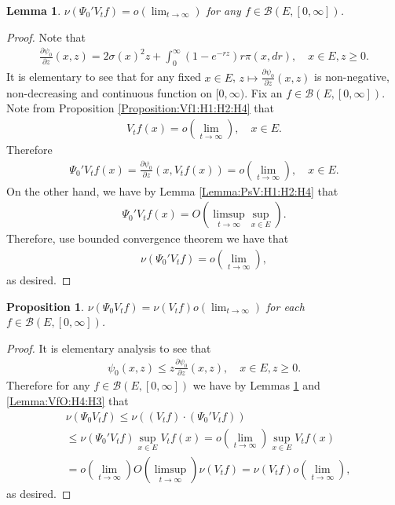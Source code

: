 \documentclass[12pt,a4paper]{amsart}
\numberwithin{equation}{section}
\theoremstyle{plain}
\newtheorem{lem}[thm]{Lemma}
\newtheorem{prop}[thm]{Proposition}
\theoremstyle{definition}
\theoremstyle{remark}
\begin{document}
\begin{lem} \label{Lemma:nPPV:H1:H2:H4}
 $\nu(\Psi_0' V_t f) = o(\lim_{t\to \infty})$ for any $f\in \mathcal B(E,[0,\infty])$.
\end{lem}
\begin{proof}
Note that
\begin{align}
 \frac{\partial \psi_0 }{ \partial z} (x,z)
 = 2\sigma (x)^2 z + \int_0^\infty (1 - e^{- rz}) r \pi(x,dr),
 \quad x\in E, z\geq 0.
  \end{align}
It is elementary to see that for any fixed $x\in E$, $z\mapsto \frac{\partial \psi_0}{\partial z} (x,z)$ is non-negative, non-decreasing and continuous function on $[0,\infty)$.
Fix an $f\in \mathcal B(E,[0,\infty])$.
Note from Proposition \ref{Proposition:Vf1:H1:H2:H4} that
\begin{align}
  V_tf(x)
  = o(\lim_{t\to \infty}),
\quad x\in E.
  \end{align}
Therefore
\begin{align}
 \Psi_0' V_tf(x)
 =\frac{\partial \psi_0}{ \partial z}(x,V_tf(x))
 = o(\lim_{t\to \infty}),
\quad x\in E.
 \end{align}
On the other hand, we have by Lemma \ref{Lemma:PsV:H1:H2:H4} that
\begin{align}
  \Psi_0'V_t f(x)
  = O(\limsup_{t\to \infty}\sup_{x\in E}).
  \end{align}
Therefore, use bounded convergence theorem we have that
\begin{align}
  \nu(\Psi_0' V_tf)
  = o(\lim_{t\to \infty}),
  \end{align}
as desired.
\end{proof}
\begin{prop} \label{Proposition:nP:H1:H2:H3:H4}
$\nu(\Psi_0 V_t f) = \nu(V_tf) o(\lim_{t\to \infty})$ for each $f\in \mathcal B(E,[0,\infty])$.
\end{prop}
\begin{proof}
It is elementary analysis to see that
\begin{align}
  \psi_0(x,z)
  \leq z \frac{\partial \psi_0}{\partial z}(x,z),
  \quad x\in E, z\geq 0.
  \end{align}
Therefore for any $f\in \mathcal B(E,[0,\infty])$ we have by Lemmas \ref{Lemma:nPPV:H1:H2:H4} and \ref{Lemma:VfO:H4:H3} that
\begin{align}
  &\nu(\Psi_0 V_tf)
\leq \nu((V_tf)\cdot (\Psi_0' V_tf))
\\&  \leq \nu(\Psi_0' V_tf) \sup_{x\in E} V_tf(x)
  = o(\lim_{t\to \infty}) \sup_{x\in E} V_tf(x)
  \\&= o(\lim_{t\to \infty}) O(\limsup_{t\to \infty}) \nu(V_tf)
  = \nu(V_tf) o(\lim_{t\to \infty}),
  \end{align}
as desired.
\end{proof}
\end{document}
